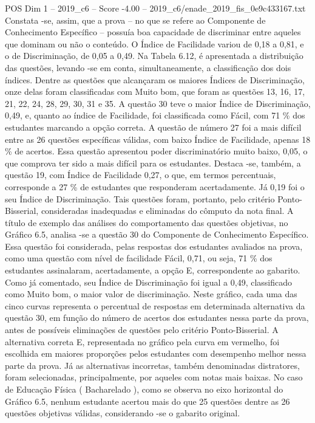 \begin{textsample}{POS Dim 1 – 2019\_c6 – Score -4.00 – 2019\_c6/enade\_2019\_fis\_0e9c433167.txt}
Constata -se, assim, que a prova – no que se refere ao Componente de Conhecimento Específico – possuía boa capacidade de discriminar entre aqueles que dominam ou não o conteúdo.
O Índice de Facilidade variou de 0,18 a 0,81, e o de Discriminação, de 0,05 a 0,49.
Na Tabela 6.12, é apresentada a distribuição das questões, levando -se em conta, simultaneamente, a classificação dos dois índices.
Dentre as questões que alcançaram os maiores Índices de Discriminação, onze delas foram classificadas com Muito bom, que foram as questões 13, 16, 17, 21, 22, 24, 28, 29, 30, 31 e 35.
A questão 30 teve o maior Índice de Discriminação, 0,49, e, quanto ao índice de Facilidade, foi classificada como Fácil, com 71 \% dos estudantes marcando a opção correta.
A questão de número 27 foi a mais difícil entre as 26 questões específicas válidas, com baixo Índice de Facilidade, apenas 18 \% de acertos.
Essa questão apresentou poder discriminatório muito baixo, 0,05, o que comprova ter sido a mais difícil para os estudantes.
Destaca -se, também, a questão 19, com Índice de Facilidade 0,27, o que, em termos percentuais, corresponde a 27 \% de estudantes que responderam acertadamente.
Já 0,19 foi o seu Índice de Discriminação.
Tais questões foram, portanto, pelo critério Ponto-Bisserial, consideradas inadequadas e eliminadas do cômputo da nota final.
A título de exemplo das análises do comportamento das questões objetivas, no Gráfico 6.5, analisa -se a questão 30 do Componente de Conhecimento Específico.
Essa questão foi considerada, pelas respostas dos estudantes avaliados na prova, como uma questão com nível de facilidade Fácil, 0,71, ou seja, 71 \% dos estudantes assinalaram, acertadamente, a opção E, correspondente ao gabarito.
Como já comentado, seu Índice de Discriminação foi igual a 0,49, classificado como Muito bom, o maior valor de discriminação.
Neste gráfico, cada uma das cinco curvas representa o percentual de respostas em determinada alternativa da questão 30, em função do número de acertos dos estudantes nessa parte da prova, antes de possíveis eliminações de questões pelo critério Ponto-Bisserial.
A alternativa correta E, representada no gráfico pela curva em vermelho, foi escolhida em maiores proporções pelos estudantes com desempenho melhor nessa parte da prova.
Já as alternativas incorretas, também denominadas distratores, foram selecionadas, principalmente, por aqueles com notas mais baixas.
No caso de Educação Física ( Bacharelado ), como se observa no eixo horizontal do Gráfico 6.5, nenhum estudante acertou mais do que 25 questões dentre as 26 questões objetivas válidas, considerando -se o gabarito original.

\end{textsample}
